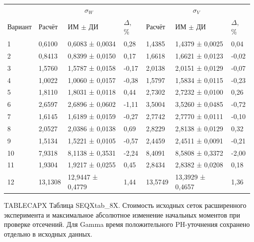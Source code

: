 \setlength{\tabcolsep}{2pt}
\begin{tabular}{p{4.16cm}p{1.61cm}p{2.83cm}p{1.28cm}p{1.61cm}p{2.83cm}p{1.28cm}}
\toprule
 & \multicolumn{3}{c}{$\sigma_W$} & \multicolumn{3}{c}{$\sigma_V$} \\
Вариант & Расчёт & ИМ $\pm$ ДИ & $\Delta$, \% & Расчёт & ИМ $\pm$ ДИ & $\Delta$, \% \\
\midrule
1 & 0,6100 & 0,6083 ± 0,0034 & 0,28 & 1,4385 & 1,4379 ± 0,0025 & 0,04 \\
2 & 0,8413 & 0,8399 ± 0,0150 & 0,17 & 1,6618 & 1,6621 ± 0,0123 & -0,02 \\
3 & 1,5760 & 1,5787 ± 0,0158 & -0,17 & 2,0138 & 2,0151 ± 0,0129 & -0,07 \\
4 & 1,0022 & 1,0060 ± 0,0157 & -0,38 & 1,5797 & 1,5834 ± 0,0115 & -0,23 \\
5 & 1,8110 & 1,8031 ± 0,0118 & 0,44 & 2,7302 & 2,7232 ± 0,0100 & 0,26 \\
6 & 2,6597 & 2,6896 ± 0,0602 & -1,11 & 3,5004 & 3,5260 ± 0,0485 & -0,72 \\
7 & 1,6145 & 1,6189 ± 0,0159 & -0,27 & 2,7742 & 2,7770 ± 0,0111 & -0,10 \\
8 & 2,0527 & 2,0386 ± 0,0138 & 0,69 & 2,8229 & 2,8138 ± 0,0129 & 0,32 \\
9 & 1,5134 & 1,5221 ± 0,0105 & -0,57 & 2,4459 & 2,4511 ± 0,0091 & -0,21 \\
10 & 7,9318 & 8,1138 ± 0,3531 & -2,24 & 8,4091 & 8,5808 ± 0,3372 & -2,00 \\
11 & 1,9304 & 1,9217 ± 0,0255 & 0,45 & 2,8434 & 2,8382 ± 0,0208 & 0,18 \\
12 & 13,1308 & 12,9447 ± 0,4779 & 1,44 & 13,5749 & 13,3929 ± 0,4657 & 1,36 \\
\bottomrule
\end{tabular}




\noindent TABLECAPX Таблица SEQXtab_8X. Стоимость исходных сеток расширенного эксперимента и максимальное абсолютное изменение начальных моментов при проверке отсечений. Для Gamma время положительного PH-уточнения сохранено отдельно в исходных данных.\par


